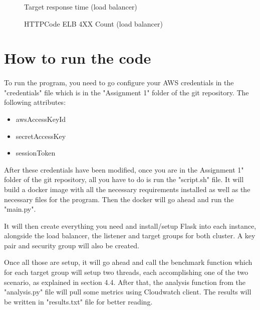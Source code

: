 \documentclass[12pt]{article}
\begin{document}
            \begin{figure}[htpb]
                \centering
                    \caption{Target response time (load balancer)}
                    \label{fig:targetresponsetimeelb}
                \end{figure}
        \begin{figure}[htpb]
                \centering
                    \caption{HTTPCode ELB 4XX Count (load balancer)}
                    \label{fig:httpelb}
                \end{figure}

	\pagebreak


\section{How to run the code} \label{sec:runcode}
	\paragraph{} To run the program, you need to go configure your AWS credentials in the "credentials" file which is in the "Assignment 1" folder of the git repository. The following attributes:
	\begin{itemize}
      \item awsAccessKeyId
      \item secretAccessKey
      \item sessionToken
    \end{itemize}
    After these credentials have been modified, once you are in the Assignment 1" folder of the git repository, all you have to do is run the "script.sh" file. It will build a docker image with all the necessary requirements installed as well as the necessary files for the program. Then the docker will go ahead and run the "main.py".
    
    \bigskip
    
    \noindent It will then create everything you need and install/setup Flask into each instance, alongside the load balancer, the listener and target groups for both cluster. A key pair and security group will also be created.
	
	\bigskip
	
	\noindent Once all those are setup, it will go ahead and call the benchmark function which for each target group will setup two threads, each accomplishing one of the two scenario, as explained in section 4.4. After that, the analysis function from the "analysis.py" file will pull some metrics using Cloudwatch client. The results will be written in "results.txt" file for better reading. 
	
\end{document}
